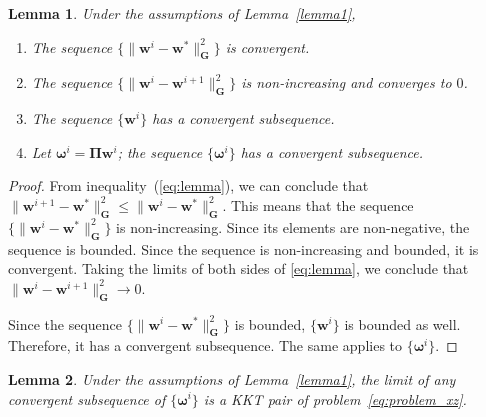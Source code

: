 \documentclass[10pt,twocolumn,twoside]{IEEEtran}
\newcommand{\wt}{\mathbf{w}} %
\newcommand{\G}{\mathbf{G}} %
\newtheorem{lemma}{Lemma}
\begin{document}
\begin{lemma}  \label{lemma3}
	Under the assumptions of Lemma~\ref{lemma1},
	\begin{enumerate}
		\item The sequence $\{\| \wt^i - \wt^* \|^2_{\G}\}$ is convergent.

		\item The sequence $\{\| \wt^i - \wt^{i+1} \|^2_{\G}\}$ is non-increasing and converges to $0$.

		\item The sequence $\{\wt^i\}$ has a convergent subsequence.

		\item Let $\bm{\omega}^i = \bm{\Pi} \wt^i$; the sequence $\{\bm{\omega}^i\}$ has a convergent subsequence.
	\end{enumerate}
\end{lemma}

\begin{proof}
	From inequality~(\ref{eq:lemma}), we can conclude that $\| \wt^{i+1} - \wt^{*} \|^2_{\G} \leq \| \wt^i - \wt^{*} \|^2_{\G}$. This means that the sequence $\{\| \wt^i - \wt^{*} \|^2_{\G}\}$ is non-increasing. Since its elements are non-negative, the sequence is bounded.	Since the sequence is non-increasing and bounded, it is convergent. Taking the limits of both sides of \eqref{eq:lemma}, we conclude that $\| \wt^i - \wt^{i+1} \|^2_{\G} \to 0$.

	Since the sequence $\{\| \wt^i - \wt^{*} \|^2_{\G}\}$ is bounded, $\{\wt^i\}$ is bounded as well. Therefore, it has a convergent subsequence. The same applies to $\{\bm{\omega}^i\}$.
\end{proof}

\begin{lemma} \label{lemma4}
	Under the assumptions of Lemma~\ref{lemma1}, the limit of any convergent subsequence of $\{\bm{\omega}^i\}$ is a KKT pair of problem~\eqref{eq:problem_xz}.
\end{lemma}
\end{document}
